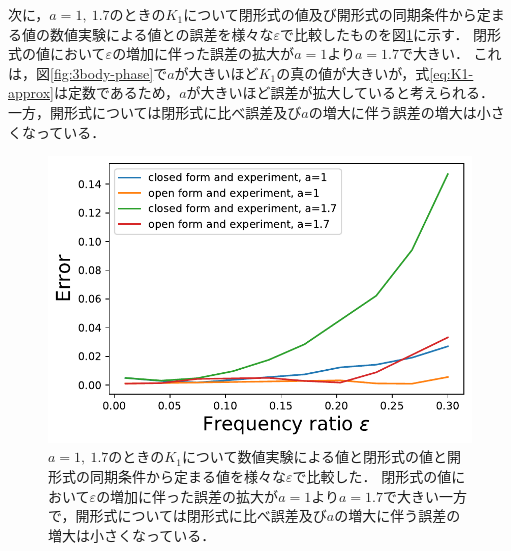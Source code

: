 \documentclass[../main]{subfiles}
\begin{document}
次に，$a=1,\ 1.7$のときの$K_1$について閉形式の値及び開形式の同期条件から定まる値の数値実験による値との誤差を様々な$\varepsilon$で比較したものを図\ref{fig:k1-error}に示す．
閉形式の値において$\varepsilon$の増加に伴った誤差の拡大が$a=1$より$a=1.7$で大きい．
これは，図\ref{fig:3body-phase}で$a$が大きいほど$K_1$の真の値が大きいが，式\eqref{eq:K1-approx}は定数であるため，$a$が大きいほど誤差が拡大していると考えられる．
一方，開形式については閉形式に比べ誤差及び$a$の増大に伴う誤差の増大は小さくなっている．
\begin{figure}[tbp]
\centering
\includegraphics[width=135mm]{./images/k1-error.pdf}
\centering
\caption{$a=1,\ 1.7$のときの$K_1$について数値実験による値と閉形式の値と開形式の同期条件から定まる値を様々な$\varepsilon$で比較した．
閉形式の値において$\varepsilon$の増加に伴った誤差の拡大が$a=1$より$a=1.7$で大きい一方で，開形式については閉形式に比べ誤差及び$a$の増大に伴う誤差の増大は小さくなっている．}
\label{fig:k1-error}
\end{figure}
\end{document}
